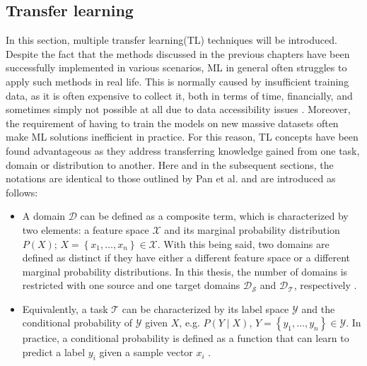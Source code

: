 \subsection{Transfer learning}
\label{transferLearning} 
In this section, multiple transfer learning(TL) techniques will be introduced. Despite the fact that the methods discussed in the previous chapters have been successfully implemented in various scenarios, ML in general often struggles to apply such methods in real life. This is normally caused by insufficient training data, as it is often expensive to collect it, both in terms of time, financially, and sometimes simply not possible at all due to data accessibility issues \cite{Zhuang2019}. Moreover, the requirement of having to train the models on new massive datasets often make ML solutions inefficient in practice. For this reason, TL concepts have been found advantageous as they address transferring knowledge gained from one task, domain or distribution to another. Here and in the subsequent sections, the notations are identical to those outlined by Pan et al. \cite{Pan2010} and are introduced as follows:  

\begin{itemize}
\item A domain $\mathcal{D}$ can be defined as a composite term, which is characterized by two elements: a feature space $\mathcal{X}$ and its  marginal probability distribution $P(X)$; $X=\left\{x_{1}, \ldots, x_{n}\right\} \in \mathcal{X}$. With this being said, two domains are defined as distinct if they have either a different feature space or a different marginal probability distributions. In this thesis, the number of domains is restricted with one source and one target domains $\mathcal{D_S}$ and $\mathcal{D_T}$, respectively \cite{Pan2010}. 
\item Equivalently, a task $\mathcal{T}$ can be characterized by its label space $\mathcal{Y}$ and the conditional probability of $\mathcal{Y}$ given $X$, e.g. $P(Y \mid X)$, $Y=\left\{y_{1}, \ldots, y_{n}\right\} \in \mathcal{Y}$. In practice, a conditional probability is defined as a function that can learn to predict a label $y_i$ given a sample vector $x_i$ \cite{Pan2010}. 
\end{itemize} 


